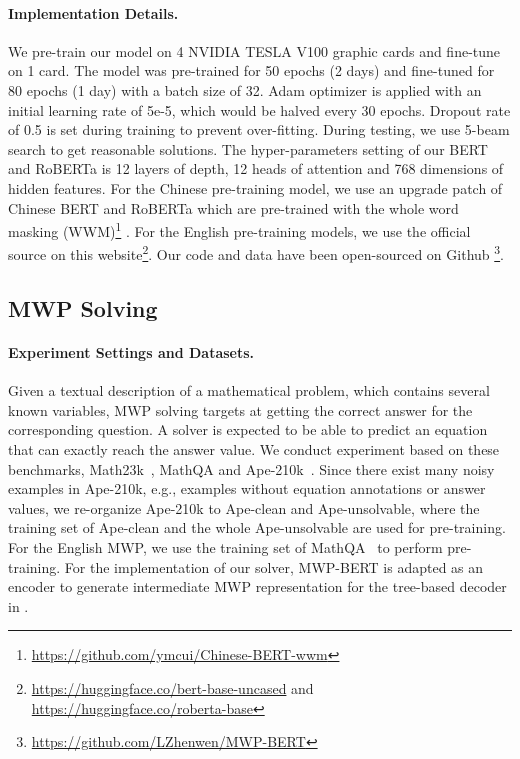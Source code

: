 \documentclass[11pt]{article}
\begin{document}
\paragraph{Implementation Details.}
We pre-train our model on 4 NVIDIA TESLA V100 graphic cards and fine-tune on 1 card. The model was pre-trained for 50 epochs (2 days) and fine-tuned for 80 epochs (1 day) with a batch size of 32. Adam optimizer \cite{kingma2014adam} is applied with an initial learning rate of 5e-5, which would be halved every 30 epochs. Dropout rate of 0.5 is set during training to prevent over-fitting. During testing, we use 5-beam search to get reasonable solutions. The hyper-parameters setting of our BERT and RoBERTa is 12 layers of depth, 12 heads of attention and 768 dimensions of hidden features.  For the Chinese pre-training model, we use an upgrade patch of Chinese BERT and RoBERTa which are pre-trained with the whole word masking (WWM)\footnote{\url{https://github.com/ymcui/Chinese-BERT-wwm}} \cite{cui2020revisiting}. For the English pre-training models, we use the official source on this website\footnote{\url{https://huggingface.co/bert-base-uncased} and \url{https://huggingface.co/roberta-base}}. Our code and data have been open-sourced on Github \footnote{\url{https://github.com/LZhenwen/MWP-BERT}}. 



\subsection{MWP Solving}\label{experiment:mwpsolving}
\paragraph{Experiment Settings and Datasets.}
Given a textual description of a mathematical problem, which contains several known variables, MWP solving targets at getting the correct answer for the corresponding question. A solver is expected to be able to predict an equation that can exactly reach the answer value. We conduct experiment based on these benchmarks, Math23k~\cite{wang2017deep}, MathQA \cite{amini2019mathqa} and Ape-210k~\cite{zhao2020ape210k}. Since there exist many noisy examples in Ape-210k, e.g., examples without equation annotations or answer values, we re-organize Ape-210k to Ape-clean and Ape-unsolvable, where the training set of Ape-clean and the whole Ape-unsolvable are used for pre-training. For the English MWP, we use the training set of MathQA~\cite{amini2019mathqa} to perform pre-training. For the implementation of our solver, MWP-BERT is adapted as an encoder to generate intermediate MWP representation for the tree-based decoder in \citet{xie2019goal}. 
\end{document}
